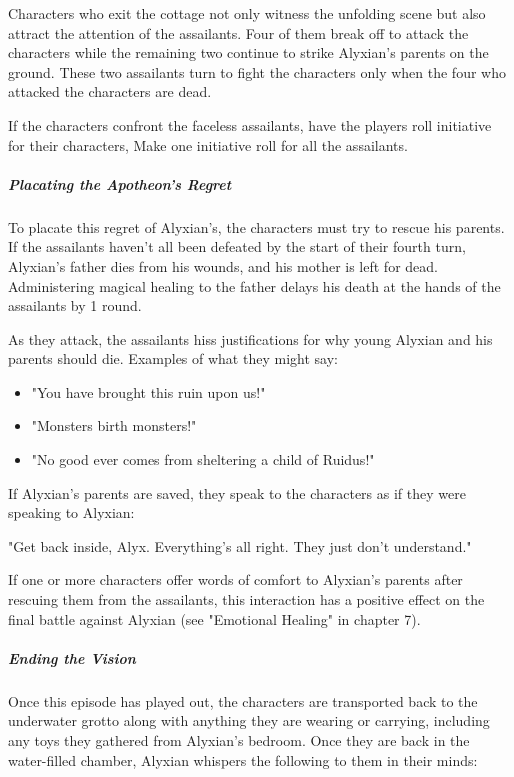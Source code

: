 \documentclass[10pt,a4paper,twoside,fancy,bg=print,twocolumn,openany,nodeprecatedcode]{dndbook}
\begin{document}
Characters who exit the cottage not only witness the unfolding scene but also attract the attention of the assailants. Four of them break off to attack the characters while the remaining two continue to strike Alyxian's parents on the ground. These two assailants turn to fight the characters only when the four who attacked the characters are dead.

If the characters confront the faceless assailants, have the players roll initiative for their characters, Make one initiative roll for all the assailants.

\subparagraph{Placating the Apotheon's Regret}
To placate this regret of Alyxian's, the characters must try to rescue his parents. If the assailants haven't all been defeated by the start of their fourth turn, Alyxian's father dies from his wounds, and his mother is left for dead. Administering magical healing to the father delays his death at the hands of the assailants by 1 round.

As they attack, the assailants hiss justifications for why young Alyxian and his parents should die. Examples of what they might say:


\begin{itemize}
\item "You have brought this ruin upon us!"
\item "Monsters birth monsters!"
\item "No good ever comes from sheltering a child of Ruidus!"
\end{itemize}

If Alyxian's parents are saved, they speak to the characters as if they were speaking to Alyxian:

\begin{DndReadAloud}{}
"Get back inside, Alyx. Everything's all right. They just don't understand."

\end{DndReadAloud}

If one or more characters offer words of comfort to Alyxian's parents after rescuing them from the assailants, this interaction has a positive effect on the final battle against Alyxian (see "Emotional Healing" in chapter 7).

\subparagraph{Ending the Vision}
Once this episode has played out, the characters are transported back to the underwater grotto along with anything they are wearing or carrying, including any toys they gathered from Alyxian's bedroom. Once they are back in the water-filled chamber, Alyxian whispers the following to them in their minds:
\end{document}
